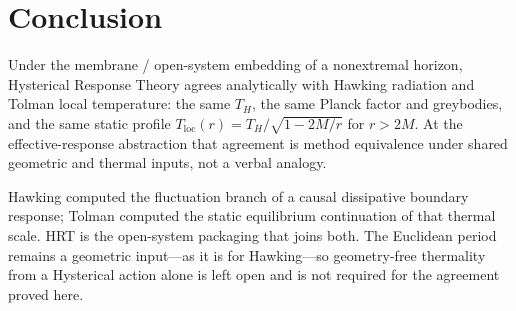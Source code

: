 \documentclass[11pt]{article}
\theoremstyle{definition}
\theoremstyle{remark}
\begin{document}
\section{Conclusion}
\label{sec:conclusion}
Under the membrane / open-system embedding of a nonextremal horizon, Hysterical Response
Theory agrees analytically with Hawking radiation and Tolman local temperature:
the same $T_H$, the same Planck factor and greybodies, and the same static profile
$T_{\mathrm{loc}}(r)=T_H/\sqrt{1-2M/r}$ for $r>2M$.
At the effective-response abstraction that agreement is method equivalence under shared
geometric and thermal inputs, not a verbal analogy.

Hawking computed the fluctuation branch of a causal dissipative boundary response;
Tolman computed the static equilibrium continuation of that thermal scale.
HRT is the open-system packaging that joins both.
The Euclidean period remains a geometric input---as it is for Hawking---so
geometry-free thermality from a Hysterical action alone is left open and is not required
for the agreement proved here.



\end{document}
